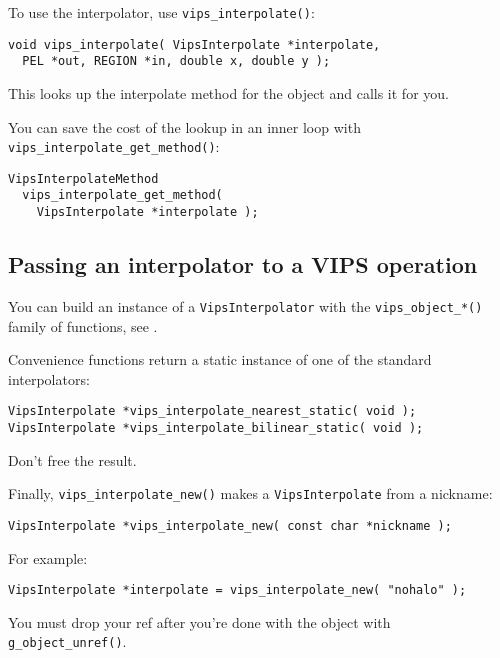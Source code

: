To use the interpolator, use \verb+vips_interpolate()+:

\begin{verbatim}
void vips_interpolate( VipsInterpolate *interpolate,
  PEL *out, REGION *in, double x, double y );
\end{verbatim}

\noindent
This looks up the interpolate method for the object and calls it for you.

You can save the cost of the lookup in an inner loop with
\verb+vips_interpolate_get_method()+:

\begin{verbatim}
VipsInterpolateMethod 
  vips_interpolate_get_method( 
    VipsInterpolate *interpolate );
\end{verbatim}

\subsection{Passing an interpolator to a VIPS operation}

You can build an instance of a \verb+VipsInterpolator+ with
the \verb+vips_object_*()+ family of functions, see .

Convenience functions return a static instance of one of the standard
interpolators:

\begin{verbatim}
VipsInterpolate *vips_interpolate_nearest_static( void );
VipsInterpolate *vips_interpolate_bilinear_static( void );
\end{verbatim}

\noindent
Don't free the result.

Finally, \verb+vips_interpolate_new()+ makes a \verb+VipsInterpolate+ from a
nickname:

\begin{verbatim}
VipsInterpolate *vips_interpolate_new( const char *nickname );
\end{verbatim}

For example:

\begin{verbatim}
VipsInterpolate *interpolate = vips_interpolate_new( "nohalo" );
\end{verbatim}

\noindent
You must drop your ref after you're done with the object with
\verb+g_object_unref()+.
